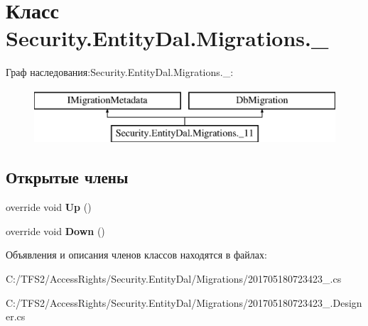 \hypertarget{class_security_1_1_entity_dal_1_1_migrations_1_1__11}{}\section{Класс Security.\+Entity\+Dal.\+Migrations.\+\_}
\label{class_security_1_1_entity_dal_1_1_migrations_1_1__11}
Граф наследования\+:Security.\+Entity\+Dal.\+Migrations.\+\_\+:\begin{figure}[H]
\begin{center}
\leavevmode
\includegraphics[height=2.000000cm]{d3/d80/class_security_1_1_entity_dal_1_1_migrations_1_1__11}
\end{center}
\end{figure}
\subsection*{Открытые члены}
\begin{DoxyCompactItemize}
\item 
\mbox{\label{class_security_1_1_entity_dal_1_1_migrations_1_1__11_a40f2c2bb93db0bea4d15d0bdd59e6c94}} 
override void {\bfseries Up} ()
\item 
\mbox{\label{class_security_1_1_entity_dal_1_1_migrations_1_1__11_a0eb5d1cd0581d8bdf7b5c6ea334b13ab}} 
override void {\bfseries Down} ()
\end{DoxyCompactItemize}


Объявления и описания членов классов находятся в файлах\+:\begin{DoxyCompactItemize}
\item 
C\+:/\+T\+F\+S2/\+Access\+Rights/\+Security.\+Entity\+Dal/\+Migrations/201705180723423\+\_.\+cs\item 
C\+:/\+T\+F\+S2/\+Access\+Rights/\+Security.\+Entity\+Dal/\+Migrations/201705180723423\+\_.\+Designer.\+cs\end{DoxyCompactItemize}
